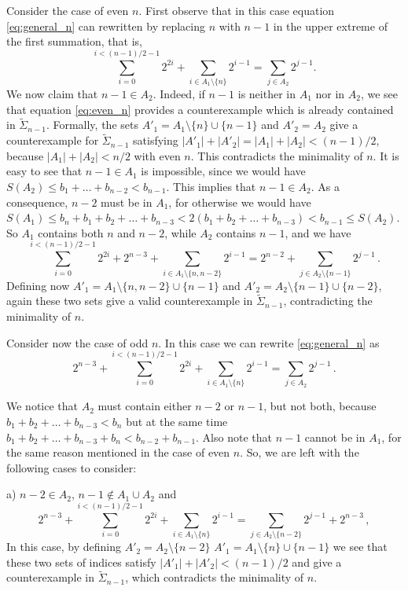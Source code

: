 \documentclass[a4paper]{amsart}
\theoremstyle{plain}
\begin{document}
Consider the case of even $n$. First observe that in this case equation \eqref{eq:general_n} can rewritten by replacing $n$ with $n-1$ in the upper extreme of the first summation, that is,
\begin{equation}
\sum_{i=0}^{ i<(n-1)/2-1} 2^{2i}+\sum_{i\in A_1\setminus \{n\}} 2^{i-1}=\sum_{j\in A_2}2^{j-1}.
\label{eq:even_n}
\end{equation}
We now claim that $n-1\in A_2$. Indeed, if $n-1$ is neither in $A_1$ nor in $A_2$,
we see that equation \eqref{eq:even_n} provides a counterexample which is already contained in $\widetilde{\Sigma}_{n-1}$. Formally, the sets $A'_1=A_1\setminus \{n\}\cup \{n-1\}$ and $A'_2=A_2$ give a counterexample for $\widetilde{\Sigma}_{n-1}$ satisfying $|A'_1|+|A'_2|=|A_1|+|A_2|<(n-1)/2$, because $|A_1|+|A_2|<n/2$ with even $n$. This contradicts the minimality of $n$. It is easy to see that $n-1\in A_1$ is impossible, since we would have $S(A_2)\leq b_1+\ldots+ b_{n-2}<b_{n-1}$. This implies that $n-1 \in A_2$. As a consequence, $n-2$ must be in $A_1$, for otherwise we would have $S(A_1)\leq b_n+b_1+b_2+\ldots +  b_{n-3}<2(b_1+b_2+\ldots + b_{n-3})<b_{n-1}\leq S(A_2)$. So $A_1$ contains both $n$ and $n-2$, while $A_2$ contains $n-1$, and we have
\begin{equation*} \sum_{i=0}^{ i<(n-1)/2-1} 2^{2i}+2^{n-3}+\sum_{i\in A_1\setminus \{n,n-2\}} 2^{i-1}=2^{n-2}+\sum_{j\in A_2\setminus\{n-1\}}2^{j-1}\,.
\end{equation*}
Defining now $A'_1=A_1\setminus \{n,n-2\}\cup \{n-1\}$ and  $A'_2=A_2\setminus\{n-1\}\cup\{n-2\}$, again these two sets give a valid counterexample in $\widetilde{\Sigma}_{n-1}$, contradicting the minimality of $n$.

Consider now the case of odd $n$. In this case we can rewrite \eqref{eq:general_n} as
\begin{equation*}2^{n-3} + \sum_{i=0}^{ i<(n-1)/2-1} 2^{2i}+\sum_{i\in A_1\setminus \{n\}} 2^{i-1}=\sum_{j\in A_2}2^{j-1}\,.
\end{equation*}



We notice that $A_2$ must contain either $n-2$ or $n-1$, but not both, because $b_1+b_2+\ldots +b_{n-3}<b_{n}$ but at the same time $b_1+b_2+\ldots + b_{n-3}+b_n<b_{n-2}+b_{n-1}$. Also note that $n-1$ cannot be in $A_1$, for the same reason mentioned in the case of even $n$. So, we are left with the following cases to consider:

a) $n-2\in A_2$, $n-1\notin A_1\cup A_2$ and
\begin{equation*} 2^{n-3} + \sum_{i=0}^{ i<(n-1)/2-1} 2^{2i}+\sum_{i\in A_1\setminus \{n\}} 2^{i-1}=\sum_{j\in A_2\setminus \{n-2\}}2^{j-1} + 2^{n-3}\,,
\end{equation*}
 In this case, by defining $A'_2=A_2\setminus\{n-2\}$ $A'_1=A_1\setminus\{n\}\cup\{n-1\}$ we see that these two sets of indices satisfy $|A'_1|+|A'_2|<(n-1)/2$ and give a counterexample in $\widetilde{\Sigma}_{n-1}$, which contradicts the minimality of $n$.\\
\end{document}
